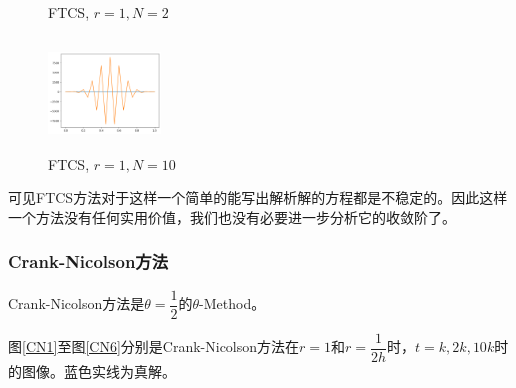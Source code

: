 \documentclass{ctexart}
\begin{document}
\begin{figure}[htbp]
\begin{minipage}{5cm}
		\caption{FTCS, $r=1,N=2$}
		\label{ftcs5}
	\end{minipage}
	\begin{minipage}{5cm}
		\centering
		\includegraphics[width = 3cm, height = 3cm]{2-4-3.png}
		\caption{FTCS, $r=1,N=10$}
		\label{ftcs6}
	\end{minipage}
\end{figure}

可见FTCS方法对于这样一个简单的能写出解析解的方程都是不稳定的。因此这样一个方法没有任何实用价值，我们也没有必要进一步分析它的收敛阶了。

\subsubsection{Crank-Nicolson方法}

Crank-Nicolson方法是$\theta=\dfrac 12$的$\theta$-Method。

图\ref{CN1}至图\ref{CN6}分别是Crank-Nicolson方法在$r=1$和$r=\dfrac 1{2h}$时，$t=k,2k,10k$时的图像。蓝色实线为真解。
\end{document}
